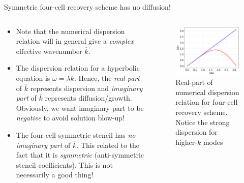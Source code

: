 \documentclass[aspectratio=169]{beamer}
\begin{document}
\begin{frame}{Symmetric four-cell recovery scheme has no diffusion!}
  \small
  \begin{columns}
    
    \begin{column}{0.6\linewidth}
      \begin{itemize}
      \item Note that the numerical dispersion relation will in
        general give a \emph{complex} effective wavenumber
        $\overline{k}$.
      \item The dispersion relation for a hyperbolic equation is
        $\omega = \lambda k$. Hence, the \emph{real part} of
        $\overline{k}$ represents dispersion and \emph{imaginary part}
        of $\overline{k}$ represents diffusion/growth. Obviously, we
        want imaginary part to be \emph{negative} to avoid solution
        blow-up!
      \item The four-cell symmetric stencil has \emph{no imaginary
          part} of $\overline{k}$. This related to the fact that it is
        \emph{symmetric} (anti-symmetric stencil coefficients). This
        is not necessarily a good thing!
      \end{itemize}
    \end{column}
  
    \begin{column}{0.4\linewidth}
      \begin{figure}
        \includegraphics[width=\linewidth]{5p-kbar.png}
        \caption{Real-part of numerical dispersion relation for
          four-cell recovery scheme. Notice the strong dispersion for
          higher-$k$ modes}
      \end{figure}
    \end{column}
  \end{columns}

\end{frame}  
\end{document}
